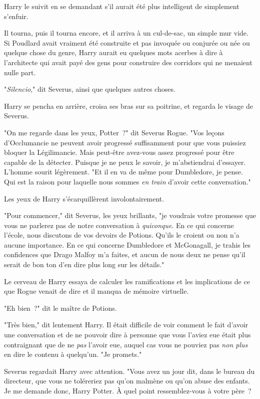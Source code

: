 Harry le suivit en se demandant s'il aurait été plus intelligent de simplement s'enfuir.

Il tourna, puis il tourna encore, et il arriva à un cul-de-sac, un simple mur vide. Si Poudlard avait vraiment été construite et pas invoquée ou conjurée ou née ou quelque chose du genre, Harry aurait eu quelques mots acerbes à dire à l'architecte qui avait payé des gens pour construire des corridors qui ne menaient nulle part.

"\emph{Silencio}," dit Severus, ainsi que quelques autres choses.

Harry se pencha en arrière, croisa ses bras sur sa poitrine, et regarda le visage de Severus.

"On me regarde dans les yeux, Potter~?" dit Severus Rogue. "Vos leçons d'Occlumancie ne peuvent avoir progressé suffisamment pour que vous puissiez bloquer la Légilimancie. Mais peut-être avez-vous assez progressé pour être capable de la détecter. Puisque je ne peux le savoir, je m'abstiendrai d'essayer. L'homme sourit légèrement. "Et il en va de même pour Dumbledore, je pense. Qui est la raison pour laquelle nous sommes \emph{en train} d'avoir cette conversation."

Les yeux de Harry s'écarquillèrent involontairement.

"Pour commencer," dit Severus, les yeux brillants, "je voudrais votre promesse que vous ne parlerez pas de notre conversation à \emph{quiconque}. En ce qui concerne l'école, nous discutons de vos devoirs de Potions. Qu'ils le croient ou non n'a aucune importance. En ce qui concerne Dumbledore et McGonagall, je trahis les confidences que Drago Malfoy m'a faites, et aucun de nous deux ne pense qu'il serait de bon ton d'en dire plus long sur les détails."

Le cerveau de Harry essaya de calculer les ramifications et les implications de ce que Rogue venait de dire et il manqua de mémoire virtuelle.

"Eh bien~?" dit le maître de Potions.

"Très bien," dit lentement Harry. Il était difficile de voir comment le fait d'avoir une conversation et de ne pouvoir dire à personne que vous l'aviez eue était plus contraignant que de ne \emph{pas} l'avoir eue, auquel cas vous ne pouviez pas \emph{non plus} en dire le contenu à quelqu'un. "Je promets."

Severus regardait Harry avec attention. "Vous avez un jour dit, dans le bureau du directeur, que vous ne toléreriez pas qu'on malmène ou qu'on abuse des enfants. Je me demande donc, Harry Potter. À quel point ressemblez-vous à votre père~?

